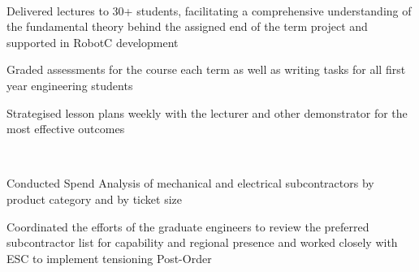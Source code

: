 \documentclass[11pt, a4paper]{MagicalCV}
\begin{document}
\begin{minipage}[t]{0.58\textwidth}
 \\
\vspace{\topsep} %
\begin{tightemize}
\item Delivered lectures to 30+ students, facilitating a comprehensive understanding of the fundamental theory behind the assigned end of the term project and supported in RobotC development
\item Graded assessments for the course each term as well as writing tasks for all first year engineering students
\item Strategised lesson plans weekly with the lecturer and other demonstrator for the most effective outcomes
\end{tightemize}
\sectionsep

 \\
\vspace{\topsep} %
\begin{tightemize}
\item Conducted Spend Analysis of mechanical and electrical subcontractors by product category and by ticket size
\item Coordinated the efforts of the graduate engineers to review the preferred subcontractor list for capability and regional presence and worked closely with ESC to implement tensioning Post-Order
\end{tightemize}
\sectionsep
\end{minipage} 
\end{document}
